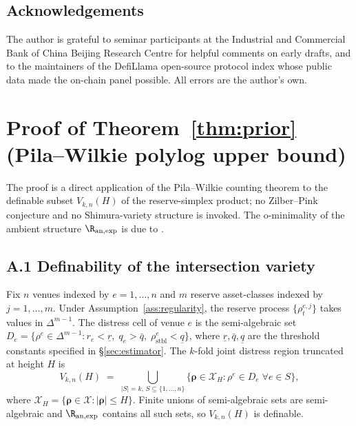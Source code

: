 \subsection*{Acknowledgements}

The author is grateful to seminar participants at the Industrial
and Commercial Bank of China Beijing Research Centre for helpful
comments on early drafts, and to the maintainers of the DefiLlama
open-source protocol index whose public data made the on-chain
panel possible. All errors are the author's own.




\appendix

\section{Proof of Theorem~\ref{thm:prior} (Pila--Wilkie polylog
upper bound)}\label{app:thm-prior}

The proof is a direct application of the Pila--Wilkie counting
theorem \citep{PilaWilkie2006} to the definable subset $V_{k,n}(H)$
of the reserve-simplex product; no Zilber--Pink conjecture and no
Shimura-variety structure is invoked. The o-minimality of the
ambient structure $\R_{\mathrm{an},\exp}$ is due to
\citet{vandenDries1998Tame}.

\subsection*{A.1 Definability of the intersection variety}

Fix $n$ venues indexed by $e = 1, \dots, n$ and $m$ reserve
asset-classes indexed by $j = 1, \dots, m$. Under
Assumption~\ref{ass:regularity}, the reserve process
$\{\rho_t^{e,j}\}$ takes values in $\Delta^{m-1}$. The distress
cell of venue $e$ is the semi-algebraic set
$D_e = \{\rho^e \in \Delta^{m-1} :
r_e < \underline r,\; q_e > \bar q,\;
\rho^e_{\text{stbl}} < \underline q\}$,
where $\underline r, \bar q, \underline q$ are the threshold
constants specified in \S\ref{sec:estimator}. The $k$-fold joint
distress region truncated at height $H$ is
\[
V_{k,n}(H) \;=\; \bigcup_{|S|=k,\, S \subseteq \{1,\dots,n\}}
\{ \boldsymbol{\rho} \in \mathcal{X}_H :
\rho^e \in D_e \; \forall e \in S \},
\]
where $\mathcal{X}_H = \{\boldsymbol{\rho} \in \mathcal{X} :
|\boldsymbol{\rho}| \le H\}$. Finite unions of semi-algebraic sets
are semi-algebraic and $\R_{\mathrm{an},\exp}$ contains all such
sets, so $V_{k,n}(H)$ is definable.


